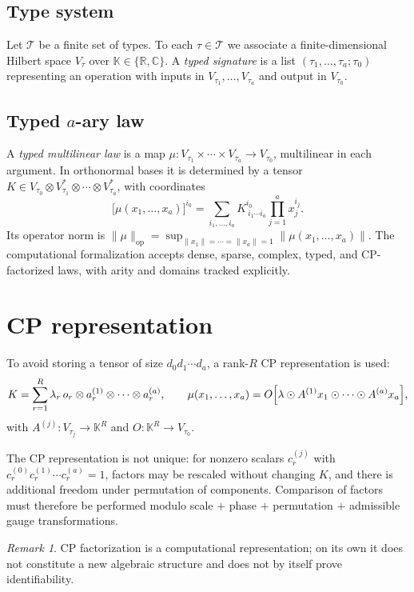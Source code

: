 \documentclass[11pt]{amsart}
\theoremstyle{definition}
\theoremstyle{remark}
\newtheorem{remark}[theorem]{Remark}
\DeclareMathOperator{\op}{op}
\begin{document}
\subsection{Type system}

Let $\mathcal T$ be a finite set of types. To each $\tau \in \mathcal T$
we associate a finite-dimensional Hilbert space $V_\tau$ over
$\mathbb K \in \{\mathbb R, \mathbb C\}$. A \emph{typed signature} is a
list $(\tau_1,\ldots,\tau_a;\tau_0)$ representing an operation with
inputs in $V_{\tau_1},\ldots,V_{\tau_a}$ and output in $V_{\tau_0}$.

\subsection{Typed $a$-ary law}

A \emph{typed multilinear law} is a map
$\mu : V_{\tau_1}\times\cdots\times V_{\tau_a} \to V_{\tau_0}$,
multilinear in each argument. In orthonormal bases it is determined by
a tensor
$K \in V_{\tau_0}\otimes V_{\tau_1}^*\otimes\cdots\otimes V_{\tau_a}^*$,
with coordinates
\[
\bigl[\mu(x_1,\ldots,x_a)\bigr]^{i_0}
= \sum_{i_1,\ldots,i_a} K^{i_0}_{\ i_1\cdots i_a}\prod_{j=1}^{a} x_j^{i_j}.
\]
Its operator norm is
$\lVert\mu\rVert_{\op} = \sup_{\lVert x_1\rVert=\cdots=\lVert x_a\rVert=1}\lVert \mu(x_1,\ldots,x_a)\rVert$.
The computational formalization accepts dense, sparse, complex, typed,
and CP-factorized laws, with arity and domains tracked explicitly.

\section{CP representation}

To avoid storing a tensor of size $d_0 d_1\cdots d_a$, a rank-$R$ CP
representation is used:
\[
K = \sum_{r=1}^{R}\lambda_r\, o_r\otimes a_r^{(1)}\otimes\cdots\otimes a_r^{(a)},
\qquad
\mu(x_1,\ldots,x_a) = O\Bigl[\lambda\odot A^{(1)}x_1\odot\cdots\odot A^{(a)}x_a\Bigr],
\]
with $A^{(j)}:V_{\tau_j}\to\mathbb K^R$ and $O:\mathbb K^R\to V_{\tau_0}$.

The CP representation is not unique: for nonzero scalars $c_r^{(j)}$
with $c_r^{(0)}c_r^{(1)}\cdots c_r^{(a)}=1$, factors may be rescaled
without changing $K$, and there is additional freedom under
permutation of components. Comparison of factors must therefore be
performed modulo scale $+$ phase $+$ permutation $+$ admissible gauge
transformations.

\begin{remark}
CP factorization is a computational representation; on its own it does
not constitute a new algebraic structure and does not by itself prove
identifiability.
\end{remark}
\end{document}
